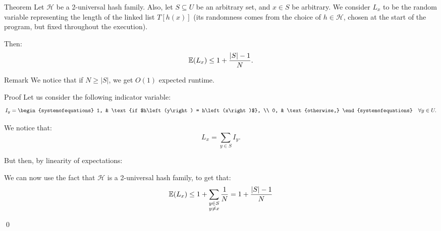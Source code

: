 \documentclass[a4paper]{article}
\begin{document}
\begin{parag}{Theorem}
    Let $\mathcal{H}$ be a 2-universal hash family. Also, let $S \subseteq U$ be an arbitrary set, and $x \in S$ be arbitrary. We consider $L_x$ to be the random variable representing the length of the linked list $T\left[h\left(x\right)\right]$ (its randomness comes from the choice of $h \in \mathcal{H}$, chosen at the start of the program, but fixed throughout the execution).

    Then: 
    \[\exval\left(L_x\right) \leq 1 + \frac{\left|S\right| - 1}{N}.\]

    \begin{subparag}{Remark}
        We notice that if $N \geq \left|S\right|$, we get $O\left(1\right)$ expected runtime.
    \end{subparag}
    
    \begin{subparag}{Proof}
        Let us consider the following indicator variable:
        \[I_y = \begin{systemofequations} 1, & \text{if $h\left(y\right) = h\left(x\right)$}, \\ 0, & \text{otherwise,} \end{systemofequations} \mathspace \forall y \in U.\]

        We notice that: 
        \[L_x = \sum_{y \in S} I_y.\]

        But then, by linearity of expectations: 

        We can now use the fact that $\mathcal{H}$ is a 2-universal hash family, to get that: 
        \[\exval\left(L_x\right) \leq 1 + \sum_{\substack{y \in S \\ y \neq x}} \frac{1}{N} = 1 + \frac{\left|S\right| - 1}{N}\]
        
        
        \qed
    \end{subparag}
\end{parag}
\end{document}

